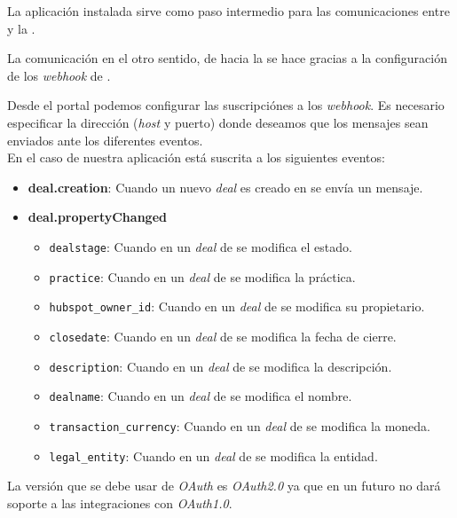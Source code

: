 La aplicación instalada sirve como paso intermedio para las comunicaciones entre \hs{} y la \iface{}.

La comunicación en el otro sentido, de \hs{} hacia la \iface{} se hace gracias a la configuración de los \textit{webhook} de \hs{}.

Desde el portal podemos configurar las suscripciónes a los \textit{webhook}. Es necesario especificar la dirección (\textit{host} y puerto) donde deseamos que los mensajes sean enviados ante los diferentes eventos.\\

En el caso de nuestra aplicación está suscrita a los siguientes eventos:
\begin{itemize}
	\item \textbf{deal.creation}: Cuando un nuevo \textit{deal} es creado en \hs{} se envía un mensaje.
	\item \textbf{deal.propertyChanged} 
		\begin{itemize}
			\item \texttt{dealstage}: Cuando en un \textit{deal} de \hs{} se modifica el estado.
			\item \texttt{practice}: Cuando en un \textit{deal} de \hs{} se modifica la práctica.
			\item \texttt{hubspot\_owner\_id}: Cuando en un \textit{deal} de \hs{} se modifica su propietario.
			\item \texttt{closedate}: Cuando en un \textit{deal} de \hs{} se modifica la fecha de cierre.
			\item \texttt{description}: Cuando en un \textit{deal} de \hs{} se modifica la descripción.
			\item \texttt{dealname}: Cuando en un \textit{deal} de \hs{} se modifica el nombre.
			\item \texttt{transaction\_currency}: Cuando en un \textit{deal} de \hs{} se modifica la moneda.
			\item \texttt{legal\_entity}: Cuando en un \textit{deal} de \hs{} se modifica la entidad.
		\end{itemize}
\end{itemize}

La versión que se debe usar de \textit{OAuth} es \textit{OAuth2.0} ya que \hs{} en un futuro no dará soporte a las integraciones con \textit{OAuth1.0}.


\section{\wday{}}

